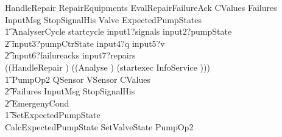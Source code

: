\documentclass{report} %
\begin{document}
\begin{circus}
    HandleRepair \circdef \lschexpract RepairEquipments \land EvalRepairFailureAck \land \Xi CValues  \land \Xi Failures \land \Xi InputMsg \land \Xi StopSignalHis \land  \Xi Valve \land \Xi ExpectedPumpStates \rschexpract\\
    \t1 AnalyserCycle \circdef startcycle \then input1?signals \then input2?pumpState \then \\
        \t2 input3?pumpCtrState \then input4?q \then input5?v \then \\
        \t2 input6?failureacks \then input7?repairs \then \\
        ((\lschexpract HandleRepair \rschexpract) \circseq
        ((\lschexpract Analyse \rschexpract) \circseq
        (startexec \then \lschexpract InfoService \rschexpract))) \\
    \t1 PumpOp2 \circdef \lschexpract \Xi QSensor \land \Xi VSensor \land \Xi CValues \land \\
        \t2 \Xi Failures \land \Xi InputMsg \land \Xi StopSignalHis \land \\
        \t2 \Xi EmergenyCond \rschexpract\\ %
    \t1 SetExpectedPumpState \circdef \lschexpract \\
      CalcExpectedPumpState \land SetValveState \land PumpOp2 \rschexpract\\ %


\end{circus}
\end{document}
